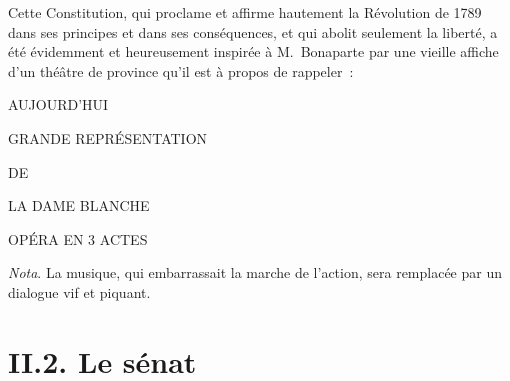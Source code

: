 \documentclass[french,twoside]{book} %
\newenvironment{quoteblock}%
  {\begin{quoting}}
  {\end{quoting}}
\newenvironment{quotebar}{%
    \def\FrameCommand{{\color{rubric!10!}\vrule width 0.5em} \hspace{0.9em}}%
    \def\OuterFrameSep{0pt} %
    \MakeFramed {\advance\hsize-\width \FrameRestore}
  }%
  {%
    \endMakeFramed
  }
\renewenvironment{quoteblock}%
  {%
    \savenotes
    \setstretch{0.9}
    \begin{quotebar}
    \smallskip
  }
  {%
    \smallskip
    \end{quotebar}
    \spewnotes
  }
\begin{document}
\noindent Cette Constitution, qui proclame et affirme hautement la Révolution de 1789 dans ses principes et dans ses conséquences, et qui abolit seulement la liberté, a été évidemment et heureusement inspirée à M. Bonaparte par une vieille affiche d’un théâtre de province qu’il est à propos de rappeler :\par

\begin{quoteblock}
 \noindent AUJOURD’HUI\par
 GRANDE REPRÉSENTATION\par
 DE\par
 LA DAME BLANCHE\par
 OPÉRA EN 3 ACTES
 \end{quoteblock}

\noindent \emph{Nota}. La musique, qui embarrassait la marche de l’action, sera remplacée par un dialogue vif et piquant.

\section[{II.2. Le sénat}]{II.2. Le sénat}
\end{document}
